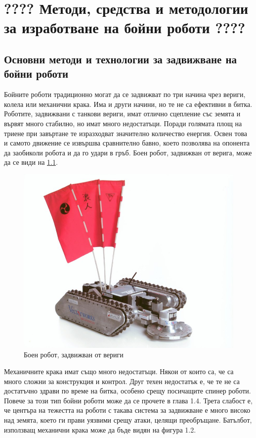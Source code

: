 \chapter{\textbf{????} Методи, средства и методологии за изработване на бойни роботи \textbf{????}}


\section{Основни методи и технологии за задвижване на бойни роботи}

Бойните роботи традиционно могат да се задвижват по три начина чрез вериги, колела или механични крака. Има и други начини, но те не са ефективни в битка.
Роботите, задвижвани с танкови вериги, имат отлично сцепление със земята и вървят много стабилно, но имат много недостатъци. Поради голямата площ на триене при завъртане те изразходват значително количество енергия. Освен това и самото движение се извършва сравнително бавно, което позволява на опонента да заобиколи робота и да го удари в гръб. Боен робот, задвижван от верига, може да се види на \cref{fig:1}.

\begin{figure}[H]
    \centering
    \includegraphics[width=0.5\linewidth]{images/using-treads.jpg}
    
    \caption{Боен робот, задвижван от вериги}
    \label{fig:1} 
\end{figure}

Механичните крака имат също много недостатъци. Някои от които са, че са много сложни за конструкция и контрол. Друг техен недостатък е, че те не са достатъчно здрави по време на битка, особено срещу посичащите спинер роботи. Повече за този тип бойни роботи може да се прочете в глава 1.4. Трета слабост е, че центъра на тежестта на роботи с такава система за задвижване е много високо над земята, което ги прави уязвими срещу атаки, целящи преобръщане. Батълбот, използващ механични крака може да бъде видян на фигура 1.2.

